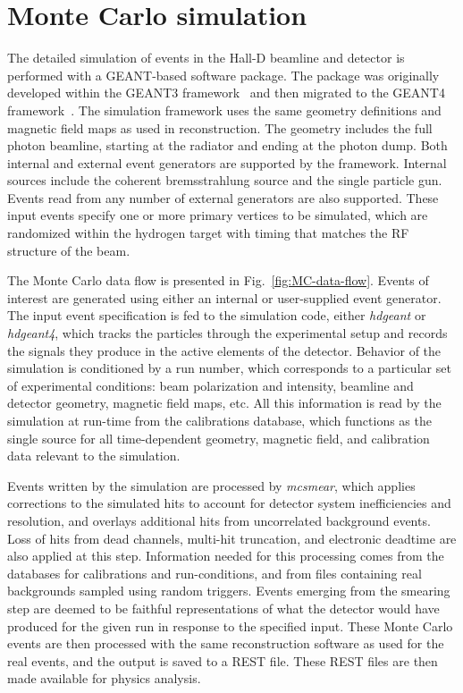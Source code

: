 \section[Monte Carlo]{Monte Carlo simulation \label{sec:simulation}}
The detailed simulation of events in the Hall-D beamline and \gx{} detector is performed with a GEANT-based software package. The package was originally developed within the GEANT3 framework~\cite{Brun:1987ma} and then migrated to the GEANT4 framework~\cite{Agostinelli:2002hh,Allison:2016lfl}. The simulation framework uses the same geometry definitions and magnetic field maps as used in reconstruction. The geometry includes the full photon beamline, starting at the radiator and ending at the photon dump. Both internal and external event generators are supported by the framework.  Internal sources include the coherent bremsstrahlung source and the single particle gun. Events read from any number of external generators are also supported. These input events specify one or more primary vertices to be simulated, which are randomized within the hydrogen target with timing that matches the RF structure of the beam.

The Monte Carlo data flow is presented in Fig.~\ref{fig:MC-data-flow}. Events of interest are generated using either an internal or user-supplied event generator. The input event specification is fed to the simulation code, either {\em hdgeant} or {\em hdgeant4}, which tracks the particles through the experimental setup and records the signals they produce in the active elements of the detector. Behavior of the simulation is conditioned by a run number, which corresponds to a particular set of experimental conditions: beam polarization and intensity, beamline and detector geometry, magnetic field maps, etc. All this information is read by the simulation at run-time from the calibrations database, which functions as the single source for all time-dependent geometry, magnetic field, and calibration data relevant to the simulation.

Events written by the simulation are processed by \emph{ mcsmear}, which applies corrections to the simulated hits to account for detector system inefficiencies and resolution, and overlays additional hits from uncorrelated background events. Loss of hits from dead channels, multi-hit truncation, and electronic deadtime are also applied at this step. Information needed for this processing comes from the databases for calibrations and run-conditions, and from files containing real backgrounds sampled using random triggers. Events emerging from the smearing step are deemed to be faithful representations of what the detector would have produced for the given run in response to the specified input. These Monte Carlo events are then processed with the same reconstruction software as used for the real events, and the output is saved to a REST file. These REST files are then made available for physics analysis.

